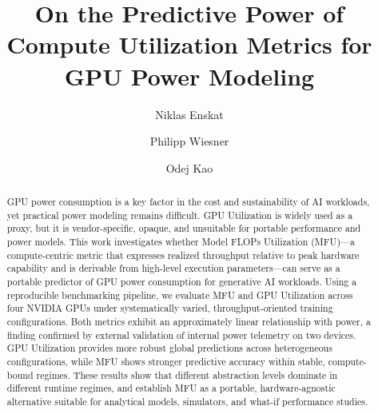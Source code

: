 \documentclass[runningheads]{llncs}
\begin{document}
\title{On the Predictive Power of Compute Utilization Metrics for GPU Power Modeling}

\author{Niklas Enskat \and Philipp Wiesner \and Odej Kao}



\maketitle      


\begin{abstract}
GPU power consumption is a key factor in the cost and sustainability of AI workloads, yet practical power modeling remains difficult. 
GPU Utilization is widely used as a proxy, but it is vendor-specific, opaque, and unsuitable for portable performance and power models. 
This work investigates whether Model FLOPs Utilization (MFU)---a compute-centric metric that expresses realized throughput relative to peak hardware capability and is derivable from high-level execution parameters---can serve as a portable predictor of GPU power consumption for generative AI workloads. 
Using a reproducible benchmarking pipeline, we evaluate MFU and GPU Utilization across four NVIDIA GPUs under systematically varied, throughput-oriented training configurations. 
Both metrics exhibit an approximately linear relationship with power, a finding confirmed by external validation of internal power telemetry on two devices.
GPU Utilization provides more robust global predictions across heterogeneous configurations, while MFU shows stronger predictive accuracy within stable, compute-bound regimes. 
These results show that different abstraction levels dominate in different runtime regimes, and establish MFU as a portable, hardware-agnostic alternative suitable for analytical models, simulators, and what-if performance studies.
\end{abstract}
\end{document}
